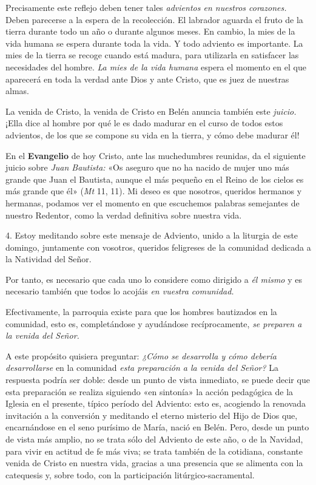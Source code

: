 Precisamente este reflejo deben tener tales \emph{advientos en nuestros
	corazones.} Deben parecerse a la espera de la recolección. El labrador
aguarda el fruto de la tierra durante todo un año o durante algunos
meses. En cambio, la mies de la vida humana se espera durante toda la
vida. Y todo adviento es importante. La mies de la tierra se recoge
cuando está madura, para utilizarla en satisfacer las necesidades del
hombre. \emph{La mies de la vida humana} espera el momento en el que
aparecerá en toda la verdad ante Dios y ante Cristo, que es juez de
nuestras almas.

La venida de Cristo, la venida de Cristo en Belén anuncia también este
\emph{juicio.} ¡Ella dice al hombre por qué le es dado madurar en el
curso de todos estos advientos, de los que se compone su vida en la
tierra, y cómo debe madurar él!

En el \textbf{Evangelio} de hoy Cristo, ante las muchedumbres reunidas,
da el siguiente juicio sobre \emph{Juan Bautista:} «Os aseguro que no ha
nacido de mujer uno más grande que Juan el Bautista, aunque el más
pequeño en el Reino de los cielos es más grande que él» (\emph{Mt} 11,
11). Mi deseo es que nosotros, queridos hermanos y hermanas, podamos ver
el momento en que escuchemos palabras semejantes de nuestro Redentor,
como la verdad definitiva sobre nuestra vida.

4. Estoy meditando sobre este mensaje de Adviento, unido a la liturgia
de este domingo, juntamente con vosotros, queridos feligreses de la
comunidad dedicada a la Natividad del Señor.

Por tanto, es necesario que cada uno lo considere como dirigido a
\emph{él mismo} y es necesario también que todos lo acojáis \emph{en
	vuestra comunidad.}

Efectivamente, la parroquia existe para que los hombres bautizados en la
comunidad, esto es, completándose y ayudándose recíprocamente, \emph{se
	preparen a la venida del Señor.}

A este propósito quisiera preguntar: \emph{¿Cómo se desarrolla y cómo
	debería desarrollarse} en la comunidad \emph{esta preparación a la
	venida del Señor?} La respuesta podría ser doble: desde un punto de
vista inmediato, se puede decir que esta preparación se realiza
siguiendo «en sintonía» la acción pedagógica de la Iglesia en el
presente, típico período del Adviento: esto es, acogiendo la renovada
invitación a la conversión y meditando el eterno misterio del Hijo de
Dios que, encarnándose en el seno purísimo de María, nació en Belén.
Pero, desde un punto de vista más amplio, no se trata sólo del Adviento
de este año, o de la Navidad, para vivir en actitud de fe más viva; se
trata también de la cotidiana, constante venida de Cristo en nuestra
vida, gracias a una presencia que se alimenta con la catequesis y, sobre
todo, con la participación litúrgico-sacramental.


